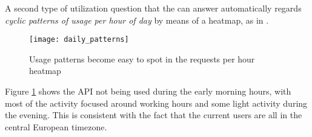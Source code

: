 
  A second type of utilization question that the \tool can answer automatically regards {\em cyclic patterns of usage per hour of day} by means of a heatmap, as in . 


    \begin{figure}[!ht]
      \centering
      \texttt{[image: daily\_patterns]}
      \caption{Usage patterns become easy to spot in the requests per hour heatmap}
      \label{fig:dp}
    \end{figure}


  Figure \ref{fig:dp} shows the API not being used during the early morning hours, with most of the activity focused around working hours and some light activity during the evening. This is consistent with the fact that the current users are all in the central European timezone. 

